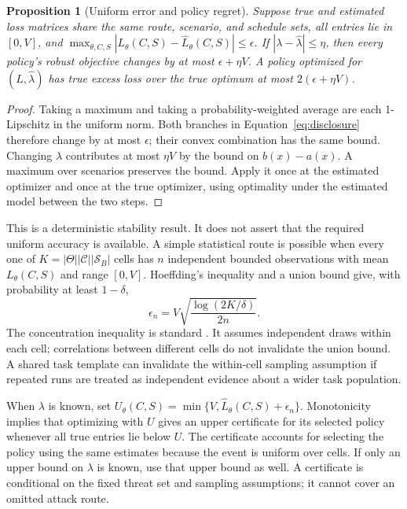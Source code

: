\documentclass[11pt,letterpaper]{article}
\newtheorem{proposition}{Proposition}
\begin{document}
\begin{proposition}[Uniform error and policy regret]
\label{prop:errors}
Suppose true and estimated loss matrices share the same route, scenario, and schedule sets, all entries lie in $[0,V]$, and
$\max_{\theta,C,S}|L_\theta(C,S)-\widehat L_\theta(C,S)|\leq\epsilon$.
If $|\lambda-\widehat\lambda|\leq\eta$, then every policy's robust objective changes by at most $\epsilon+\eta V$. A policy optimized for $(\widehat L,\widehat\lambda)$ has true excess loss over the true optimum at most $2(\epsilon+\eta V)$.
\end{proposition}

\begin{proof}
Taking a maximum and taking a probability-weighted average are each 1-Lipschitz in the uniform norm. Both branches in Equation~\ref{eq:disclosure} therefore change by at most $\epsilon$; their convex combination has the same bound. Changing $\lambda$ contributes at most $\eta V$ by the bound on $b(x)-a(x)$. A maximum over scenarios preserves the bound. Apply it once at the estimated optimizer and once at the true optimizer, using optimality under the estimated model between the two steps.
\end{proof}

This is a deterministic stability result. It does not assert that the required uniform accuracy is available. A simple statistical route is possible when every one of $K=|\Theta||\mathcal C||\mathcal S_B|$ cells has $n$ independent bounded observations with mean $L_\theta(C,S)$ and range $[0,V]$. Hoeffding's inequality and a union bound give, with probability at least $1-\delta$,
\begin{equation}
\epsilon_n=V\sqrt{\frac{\log(2K/\delta)}{2n}}.
\label{eq:hoeffding}
\end{equation}
The concentration inequality is standard \cite{hoeffding}. It assumes independent draws within each cell; correlations between different cells do not invalidate the union bound. A shared task template can invalidate the within-cell sampling assumption if repeated runs are treated as independent evidence about a wider task population.

When $\lambda$ is known, set $U_\theta(C,S)=\min\{V,\widehat L_\theta(C,S)+\epsilon_n\}$. Monotonicity implies that optimizing with $U$ gives an upper certificate for its selected policy whenever all true entries lie below $U$. The certificate accounts for selecting the policy using the same estimates because the event is uniform over cells. If only an upper bound on $\lambda$ is known, use that upper bound as well. A certificate is conditional on the fixed threat set and sampling assumptions; it cannot cover an omitted attack route.
\end{document}
